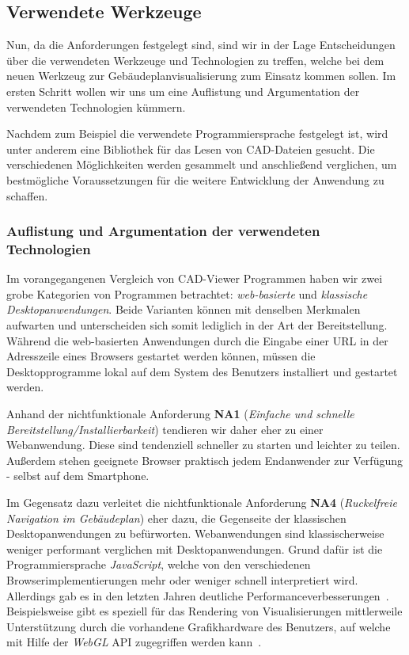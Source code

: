 \subsection{Verwendete Werkzeuge}
\label{subsec:used-tools}

Nun, da die Anforderungen festgelegt sind, sind wir in der Lage Entscheidungen über die verwendeten Werkzeuge und Technologien zu treffen, welche bei dem neuen Werkzeug zur Gebäudeplanvisualisierung zum Einsatz kommen sollen.
Im ersten Schritt wollen wir uns um eine Auflistung und Argumentation der verwendeten Technologien kümmern.

Nachdem zum Beispiel die verwendete Programmiersprache festgelegt ist, wird unter anderem eine Bibliothek für das Lesen von CAD-Dateien gesucht.
Die verschiedenen Möglichkeiten werden gesammelt und anschließend verglichen, um bestmögliche Voraussetzungen für die weitere Entwicklung der Anwendung zu schaffen.

\subsubsection{Auflistung und Argumentation der verwendeten Technologien}
\label{subsec:collection-tools}

Im vorangegangenen Vergleich von CAD-Viewer Programmen haben wir zwei grobe Kategorien von Programmen betrachtet: \textit{web-basierte} und \textit{klassische Desktopanwendungen}.
Beide Varianten können mit denselben Merkmalen aufwarten und unterscheiden sich somit lediglich in der Art der Bereitstellung.
Während die web-basierten Anwendungen durch die Eingabe einer URL in der Adresszeile eines Browsers gestartet werden können, müssen die Desktopprogramme lokal auf dem System des Benutzers installiert und gestartet werden.

Anhand der nichtfunktionale Anforderung \textbf{NA1} (\textit{Einfache und schnelle Bereitstellung/Installierbarkeit}) tendieren wir daher eher zu einer Webanwendung.
Diese sind tendenziell schneller zu starten und leichter zu teilen.
Außerdem stehen geeignete Browser praktisch jedem Endanwender zur Verfügung - selbst auf dem Smartphone.

Im Gegensatz dazu verleitet die nichtfunktionale Anforderung \textbf{NA4} (\textit{Ruckelfreie Navigation im Gebäudeplan}) eher dazu, die Gegenseite der klassischen Desktopanwendungen zu befürworten.
Webanwendungen sind klassischerweise weniger performant verglichen mit Desktopanwendungen.
Grund dafür ist die Programmiersprache \textit{JavaScript}, welche von den verschiedenen Browserimplementierungen mehr oder weniger schnell interpretiert wird.
Allerdings gab es in den letzten Jahren deutliche Performanceverbesserungen~\cite{WebAppMolecular}.
Beispielsweise gibt es speziell für das Rendering von Visualisierungen mittlerweile Unterstützung durch die vorhandene Grafikhardware des Benutzers, auf welche mit Hilfe der \textit{WebGL} API zugegriffen werden kann~\cite{WebAppMolecular}.

